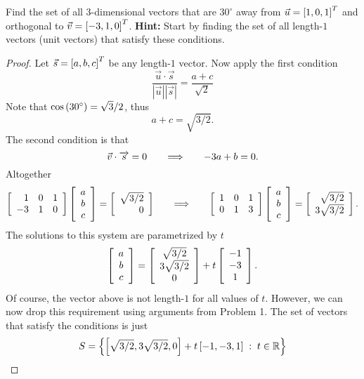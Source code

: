 \documentclass{tutorial}
\begin{document}
\begin{prob}
Find the set of all $3$-dimensional vectors that are $30^{\circ}$ away from $\vec{u} = \left[ 1, 0, 1 \right]^T$ and orthogonal to $\vec{v} = \left[ -3, 1, 0 \right]^T$. \textbf{Hint:} Start by finding the set of all length-$1$ vectors (unit vectors) that satisfy these conditions.
\end{prob} \ifsolns \begin{proof}
Let $\vec{s} = \left[ a, b, c \right]^T$ be any length-$1$ vector. Now apply the first condition
\[
  \frac{\vec{u} \cdot \overrightarrow{s}}{| \vec{u} | | \overrightarrow{s} |} = \frac{a+c}{\sqrt{2}}
\]
Note that $\cos \left( 30^{\circ} \right) = \sqrt{3}/2$, thus
\[
  a+c = \sqrt{3/2}.
\]
The second condition is that
\[
  \vec{v} \cdot \overrightarrow{s} = 0
  \hspace{0.25in} \Longrightarrow \hspace{0.25in}
  -3a + b = 0 .
\]
Altogether
\[
  \left[ \begin{array}{rrr}
     1 &  0 &  1 \\
    -3 &  1 &  0
  \end{array} \right]
  \left[ \begin{array}{c} a \\ b \\ c \end{array} \right]
   = \left[ \begin{array}{r} \sqrt{3/2} \\ 0 \end{array} \right]
   \hspace{0.25in} \Longrightarrow \hspace{0.25in}
   \left[ \begin{array}{rrr}
    1 &  0 &  1 \\
    0 &  1 &  3
  \end{array} \right]
  \left[ \begin{array}{c} a \\ b \\ c \end{array} \right]
   = \left[ \begin{array}{r} \sqrt{3/2} \\ 3\sqrt{3/2} \end{array} \right].
\]
The solutions to this system are parametrized by $t$
\[
  \left[ \begin{array}{c} a \\ b \\ c \end{array} \right]
  =
  \left[ \begin{array}{c} \sqrt{3/2} \\ 3\sqrt{3/2} \\ 0 \end{array} \right]
  + t \left[ \begin{array}{c} -1 \\ -3 \\ 1 \end{array} \right] .
\]
Of course, the vector above is not length-$1$ for all values of $t$. However, we can now drop this requirement using arguments from Problem 1. The set of vectors that satisfy the conditions is just
\[
  S = \left\{ \left[ \sqrt{3/2} , 3 \sqrt{3/2}, 0 \right] + t \left[ -1, -3, 1 \right] \; : \; t \in \mathbb{R} \right\}
\]
\end{proof}\else \newpage \fi
\end{document}
